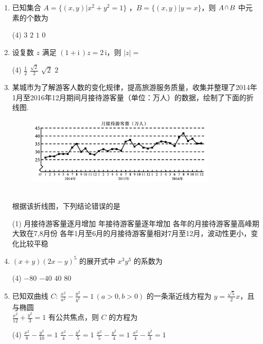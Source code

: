 \documentclass[12pt,space]{ctexart} %
\begin{document}
\begin{enumerate}[itemsep=0.2em,topsep=0pt]

  \item 已知集合 $A=\{(x,y)|x^2+y^2=1\}$ ，$B=\{(x,y)|y=x\}$，则 $A{\,\raisebox{0.8mm}{\scaleobj{0.55}{\bigcap}}\,}B$ 中元素的个数为
  \begin{tasks}(4)
    \task $3$ \task $2$ \task $1$ \task $0$ 
  \end{tasks}
  
\item 设复数 $z$ 满足 $(1+\mathrm{i}\,)z=2\,\mathrm{i}$，则 $|z|=$
\begin{tasks}(4)
	\task $\frac{1}{2}$ \task $\frac{\sqrt{2}}{2}$ \task $\sqrt{2}$ \task $2$
\end{tasks}
\item 某城市为了解游客人数的变化规律，提高旅游服务质量，收集并整理了2014年1月至2016年12月期间月接待游客量（单位：万人）的数据，绘制了下面的折线图.\\[-2.5em]
\begin{figure}[htbp]
\centering
\includegraphics[width=0.85\textwidth]{Image/iii-3.jpg}
\end{figure}\\[-1.5em]
根据该折线图，下列结论错误的是
\begin{tasks}(1)
	\task 月接待游客量逐月增加 
	\task 年接待游客量逐年增加
	\task 各年的月接待游客量高峰期大致在7,8月份 
	\task 各年1月至6月的月接待游客量相对7月至12月，波动性更小，变化比较平稳 
\end{tasks}

  \item $(x+y)(2x-y)^5$ 的展开式中 $x^3y^3$ 的系数为 
    \begin{tasks}(4)
      \task $-80$ \task $-40$ \task $40$ \task $80$ 
    \end{tasks}

	\item 已知双曲线 $\displaystyle{C\colon\,\frac{x^2}{a^2}-\frac{y^2}{b^2}=1\,(a>0,b>0)}$ 的一条渐近线方程为 $\displaystyle{y=\frac{\sqrt{5}}{2}x}$，且与椭圆\\
	  $\displaystyle{\frac{x^2}{12}+\frac{y^2}{3}=1}$ 有公共焦点，则 $C$ 的方程为
		\begin{tasks}(4)
			\task $\frac{x^2}{8}-\frac{y^2}{10}=1$ \task $\frac{x^2}{4}-\frac{y^2}{5}=1$ \task $\frac{x^2}{5}-\frac{y^2}{4}=1$ \task $\frac{x^2}{4}-\frac{y^2}{3}=1$ 
		\end{tasks}


\end{enumerate}
\end{document}
